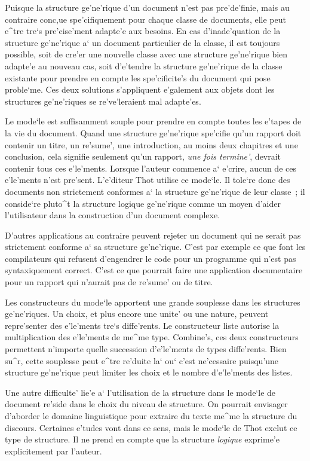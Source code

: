 Puisque la structure ge'ne'rique d'un document n'est pas pre'de'finie, mais
au contraire conc,ue spe'cifiquement pour chaque classe de documents,
elle peut e^tre tre`s pre'cise'ment adapte'e aux besoins. En cas
d'inade'quation de la structure ge'ne'rique a` un document particulier de
la classe, il est toujours possible, soit de cre'er une nouvelle classe
avec une structure ge'ne'rique bien adapte'e au nouveau cas, soit
d'e'tendre la structure ge'ne'rique de la classe existante pour prendre
en compte les spe'cificite's du document qui pose proble`me. Ces deux
solutions s'appliquent e'galement aux objets dont les structures
ge'ne'riques se re've'leraient mal adapte'es.

Le mode`le est suffisamment souple pour prendre en compte toutes
les e'tapes de la vie du document. Quand une structure ge'ne'rique spe'cifie
qu'un rapport doit contenir un titre, un re'sume', une introduction,
au moins deux chapitres et une conclusion, cela signifie seulement qu'un
rapport, {\em une fois termine'}, devrait contenir tous ces e'le'ments. Lorsque
l'auteur commence a` e'crire, aucun de ces e'le'ments n'est pre'sent. L'e'diteur
Thot utilise ce mode`le. Il tole`re donc des documents non strictement
conformes a` la structure ge'ne'rique de leur classe~; il conside`re pluto^t
la structure logique ge'ne'rique comme un moyen d'aider l'utilisateur dans
la construction d'un document complexe.

D'autres applications au contraire peuvent rejeter un document qui ne
serait pas strictement conforme a` sa structure ge'ne'rique. C'est par exemple
ce que font les compilateurs qui refusent d'engendrer le code pour un
programme qui n'est pas syntaxiquement correct. C'est ce que pourrait
faire une application documentaire pour un rapport qui n'aurait pas de
re'sume' ou de titre.

Les constructeurs du mode`le apportent une grande souplesse dans les
structures ge'ne'riques. Un choix, et plus encore une unite' ou une nature,
peuvent repre'senter des e'le'ments tre`s diffe'rents. Le constructeur liste
autorise la multiplication des e'le'ments de me^me type. Combine's, ces deux
constructeurs permettent n'importe quelle succession d'e'le'ments de types
diffe'rents. Bien su^r, cette souplesse peut e^tre re'duite la` ou` c'est
ne'cessaire puisqu'une structure ge'ne'rique peut limiter les choix et le
nombre d'e'le'ments des listes.

Une autre difficulte' lie'e a` l'utilisation de la structure dans le mode`le de
document re'side dans le choix du niveau de structure. On pourrait envisager
d'aborder le domaine linguistique pour extraire du texte me^me la structure
du discours. Certaines e'tudes vont dans ce sens, mais le mode`le de Thot
exclut ce type de structure. Il ne prend en compte que la structure
{\em logique} exprime'e explicitement par l'auteur.


